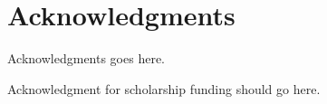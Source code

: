 \manualmark
{} %

\begingroup
\let\clearpage\relax
\let\cleardoublepage\relax
\let\cleardoublepage\relax

\chapter*{Acknowledgments}

Acknowledgments goes here.

\bigbreak

Acknowledgment for scholarship funding should go here.

\endgroup




